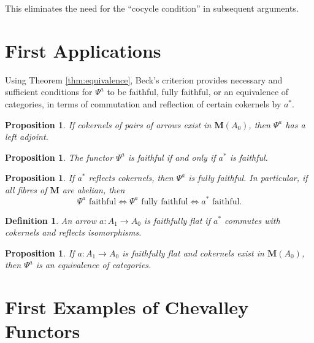 \documentclass{article}
\theoremstyle{plain}
\newtheorem{proposition}[theorem]{Proposition}
\newtheorem{definition}[theorem]{Definition}
\theoremstyle{remark}
\begin{document}
This eliminates the need for the ``cocycle condition'' in subsequent arguments.

\section{First Applications}

Using Theorem \ref{thm:equivalence}, Beck's criterion \cite{Linton1969} provides necessary and sufficient conditions for $\Psi^a$ to be faithful, fully faithful, or an equivalence of categories, in terms of commutation and reflection of certain cokernels by $a^*$.

\begin{proposition}
\label{prop:adj-left}
If cokernels of pairs of arrows exist in $\mathbf{M}(A_0)$, then $\Psi^a$ has a left adjoint.
\end{proposition}

\begin{proposition}
\label{prop:faithful}
The functor $\Psi^a$ is faithful if and only if $a^*$ is faithful.
\end{proposition}

\begin{proposition}
\label{prop:fully-faithful}
If $a^*$ reflects cokernels, then $\Psi^a$ is fully faithful. In particular, if all fibres of $\mathbf{M}$ are abelian, then
\[
\Psi^a \text{ faithful} \iff \Psi^a \text{ fully faithful} \iff a^* \text{ faithful}.
\]
\end{proposition}

\begin{definition}
\label{def:faithfully-flat}
An arrow $a : A_1 \to A_0$ is \emph{faithfully flat} if $a^*$ commutes with cokernels and reflects isomorphisms.
\end{definition}

\begin{proposition}
\label{prop:equivalence}
If $a : A_1 \to A_0$ is faithfully flat and cokernels exist in $\mathbf{M}(A_0)$, then $\Psi^a$ is an equivalence of categories.
\end{proposition}

\section{First Examples of Chevalley Functors}
\end{document}
